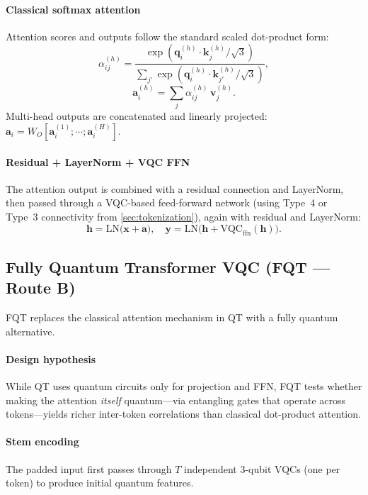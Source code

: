 \documentclass[10pt,conference]{IEEEtran}
\begin{document}
\paragraph{Classical softmax attention}
Attention scores and outputs follow the standard scaled dot-product form:
\begin{equation}
    \alpha_{ij}^{(h)} = \frac{\exp(\mathbf{q}_i^{(h)} \cdot \mathbf{k}_j^{(h)} / \sqrt{3})}
    {\sum_{j'} \exp(\mathbf{q}_i^{(h)} \cdot \mathbf{k}_{j'}^{(h)} / \sqrt{3})},
\end{equation}
\begin{equation}
    \mathbf{a}_i^{(h)} = \sum_j \alpha_{ij}^{(h)} \, \mathbf{v}_j^{(h)}.
\end{equation}
Multi-head outputs are concatenated and linearly projected: $\mathbf{a}_i = W_O [\mathbf{a}_i^{(1)}; \cdots; \mathbf{a}_i^{(H)}]$.

\paragraph{Residual + LayerNorm + VQC FFN}
The attention output is combined with a residual connection and LayerNorm, then passed through a VQC-based feed-forward network (using Type~4 or Type~3 connectivity from \cref{sec:tokenization}), again with residual and LayerNorm:
\begin{equation}
    \mathbf{h} = \mathrm{LN}\!\bigl(\mathbf{x} + \mathbf{a}\bigr), \quad
    \mathbf{y} = \mathrm{LN}\!\bigl(\mathbf{h} + \mathrm{VQC}_{\mathrm{ffn}}(\mathbf{h})\bigr).
\end{equation}

\subsection{Fully Quantum Transformer VQC (FQT --- Route B)}
\label{sec:fqt}

FQT replaces the classical attention mechanism in QT with a fully quantum alternative.

\paragraph{Design hypothesis}
While QT uses quantum circuits only for projection and FFN, FQT tests whether making the attention \emph{itself} quantum---via entangling gates that operate across tokens---yields richer inter-token correlations than classical dot-product attention.

\paragraph{Stem encoding}
The padded input first passes through $T$ independent 3-qubit VQCs (one per token) to produce initial quantum features.
\end{document}
